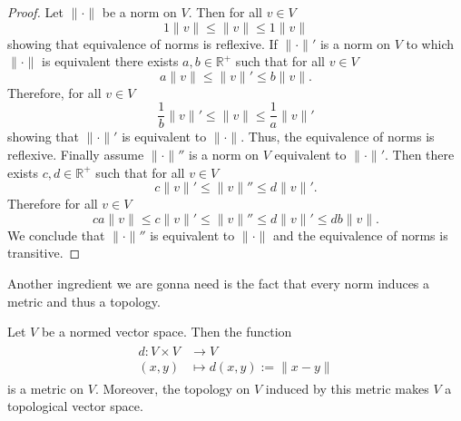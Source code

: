 \begin{proof}
	Let $\|\cdot\|$ be a norm on $V$. Then for all $v\in V$
	\begin{equation}
		1\|v\|\leq\|v\|\leq1\|v\|
	\end{equation}
showing that equivalence of norms is reflexive. If $\|\cdot\|'$ is a norm on $V$ to which $\|\cdot\|$ is equivalent there exists $a,b\in\mathbb{R}^+$ such that for all $v\in V$
	\begin{equation}
		a\|v\|\leq\|v\|'\leq b\|v\|.
	\end{equation}
Therefore, for all $v\in V$
	\begin{equation}
		\frac{1}{b}\|v\|'\leq\|v\|\leq\frac{1}{a}\|v\|'
	\end{equation}
showing that $\|\cdot\|'$ is equivalent to $\|\cdot\|$. Thus, the equivalence of norms is reflexive. Finally assume $\|\cdot\|''$ is a norm on $V$ equivalent to $\|\cdot\|'$. Then there exists $c,d\in\mathbb{R}^+$ such that for all $v\in V$
	\begin{equation}
		c\|v\|'\leq\|v\|''\leq d\|v\|'.
	\end{equation}
Therefore for all $v\in V$
	\begin{equation}
		ca\|v\|\leq c\|v\|'\leq\|v\|''\leq d\|v\|'\leq db\|v\|.
	\end{equation}
We conclude that $\|\cdot\|''$ is equivalent to $\|\cdot\|$ and the equivalence of norms is transitive.
\end{proof}

Another ingredient we are gonna need is the fact that every norm induces a metric and thus a topology.

\begin{theorem}
	Let $V$ be a normed vector space. Then the function 
	\begin{align}\label{eq:norm_metric}
	\begin{split}
		d:V\times V&\rightarrow V\\
		(x,y)&\mapsto d(x,y):=\|x-y\|
	\end{split}
	\end{align}
is a metric on $V$. Moreover, the topology on $V$ induced by this metric makes $V$ a topological vector space.
\end{theorem}

